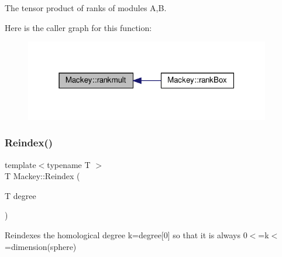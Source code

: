 The tensor product of ranks of modules A,B. 

Here is the caller graph for this function\+:\nopagebreak
\begin{figure}[H]
\begin{center}
\leavevmode
\includegraphics[width=304pt]{namespaceMackey_aaa0ce7673970bf261628768fb11a1995_icgraph}
\end{center}
\end{figure}
\mbox{\label{namespaceMackey_a7da73ade3ee83c4ffd614e79242d7c04}} 
\subsubsection{\texorpdfstring{Reindex()}{Reindex()}\hspace{0.1cm}{\footnotesize\ttfamily [1/2]}}
{\footnotesize\ttfamily template$<$typename T $>$ \\
T Mackey\+::\+Reindex (\begin{DoxyParamCaption}\item[{T}]{degree }\end{DoxyParamCaption})\hspace{0.3cm}{\ttfamily [inline]}}



Reindexes the homological degree k=degree\mbox{[}0\mbox{]} so that it is always 0$<$=k$<$=dimension(sphere) 


